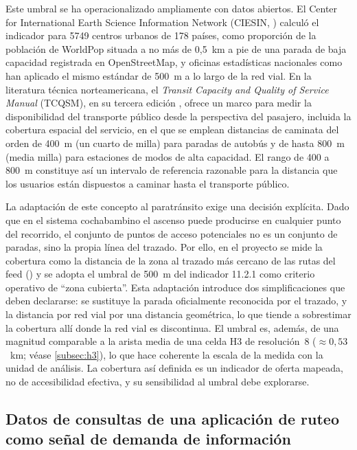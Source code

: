Este umbral se ha operacionalizado ampliamente con datos abiertos. El Center for
International Earth Science Information Network (CIESIN, \citeyear{ciesin2023}) calculó el
indicador para 5749 centros urbanos de 178 países, como proporción de la población de
WorldPop situada a no más de 0,5~km a pie de una parada de baja capacidad registrada en
OpenStreetMap, y oficinas estadísticas nacionales como \textcite{statcan2023} han aplicado
el mismo estándar de 500~m a lo largo de la red vial. En la literatura técnica
norteamericana, el \textit{Transit Capacity and Quality of Service Manual} (TCQSM), en su
tercera edición \parencite{tcqsm2013}, ofrece un marco para medir la disponibilidad del
transporte público desde la perspectiva del pasajero, incluida la cobertura espacial del
servicio, en el que se emplean distancias de caminata del orden de 400~m (un cuarto de
milla) para paradas de autobús y de hasta 800~m (media milla) para estaciones de modos de
alta capacidad. El rango de 400 a 800~m constituye así un intervalo de referencia razonable
para la distancia que los usuarios están dispuestos a caminar hasta el transporte público.

La adaptación de este concepto al paratránsito exige una decisión explícita. Dado que en el
sistema cochabambino el ascenso puede producirse en cualquier punto del recorrido, el
conjunto de puntos de acceso potenciales no es un conjunto de paradas, sino la propia línea
del trazado. Por ello, en el proyecto se mide la cobertura como la distancia de la zona al
trazado más cercano de las rutas del feed () y se adopta el umbral de 500~m
del indicador 11.2.1 como criterio operativo de \enquote{zona cubierta}. Esta adaptación
introduce dos simplificaciones que deben declararse: se sustituye la parada oficialmente
reconocida por el trazado, y la distancia por red vial por una distancia geométrica, lo que
tiende a sobrestimar la cobertura allí donde la red vial es discontinua. El umbral es,
además, de una magnitud comparable a la arista media de una celda H3 de resolución~8
($\approx 0{,}53$~km; véase \ref{subsec:h3}), lo que hace coherente la escala de la
medida con la unidad de análisis. La cobertura así definida es un indicador de oferta
mapeada, no de accesibilidad efectiva, y su sensibilidad al umbral debe explorarse.

\subsection{Datos de consultas de una aplicación de ruteo como señal de demanda de información}
\label{subsec:consultas-senal}

